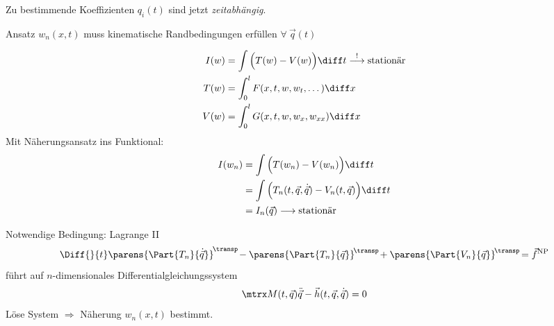 		\begin{bemerkungen}
			\item Zu bestimmende Koeffizienten $q_i(t)$ sind jetzt \emph{zeitabhängig}.
			\item Ansatz $w_n(x,t)$ muss kinematische Randbedingungen erfüllen $\forall \: \vec q(t)$
		\end{bemerkungen}
		\begin{align*}
			I(w) &= \int \Big( T(w) - V(w) \Big) \diff t \stackrel{!}{\longrightarrow} \text{stationär} \\
			T(w) &= \int_0^l F(x,t,w,w_t,\dots) \diff x \\
			V(w) &= \int_0^l G(x,t,w,w_x,w_{xx}) \diff x
		\end{align*}
		Mit Näherungsansatz ins Funktional:
		\begin{align*}
			I(w_n) &= \int \Big( T(w_n) - V(w_n) \Big) \diff t \\
			&= \int \Big( T_n(t, \vec q, \dot{\vec q}) - V_n(t, \vec q) \Big) \diff t \\
			&= I_n(\vec q) \longrightarrow \text{stationär}
		\end{align*}
		
		Notwendige Bedingung: Lagrange II
		\[
			\Diff{}{t}\parens{\Part{T_n}{\dot{\vec q}}}^{\!\transp\!} - \parens{\Part{T_n}{\vec q}}^{\!\transp\!} + \parens{\Part{V_n}{\vec q}}^{\!\transp\!} = \vec f^\text{NP}
		\]
		führt auf $n$-dimensionales Differentialgleichungssystem
		\[
			\mtrx M(t, \vec q) \ddot{\vec q} - \vec h(t, \vec q, \dot{\vec q}) = 0
		\]
		Löse System $\Rightarrow$ Näherung $w_n(x,t)$ bestimmt.
